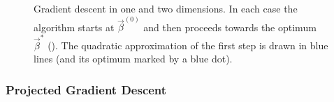 \begin{figure}[htpb]
  \centering
  \hspace*{1cm}%
  \caption{%
    Gradient descent in one and two dimensions. In each case the algorithm starts at \(\vec{\beta}^{(0)}\) and then proceeds towards the optimum \(\vec{\beta}^*\) (\optimum).
    The quadratic approximation of the first step is drawn in blue lines (and its optimum marked by a blue dot).
  }
  \label{fig:gradient-descent}
\end{figure}

\subsubsection{Projected Gradient Descent}

